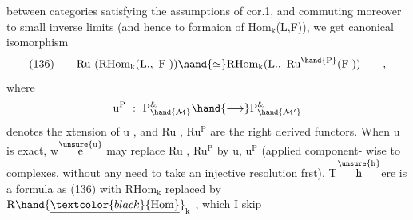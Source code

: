 between categories\deleted{,}  satisfying the assumptions of cor.1,  and 
commuting moreover to small inverse limits (and hence to formaion of
Hom$_{\mathrm{k}}$(L,F)),  we get  canonical isomorphism
\[ \text{(136)}\qquad \mathrm{Ru}\ (\mathrm{RHom}_{\mathrm{k}}(\mathrm{L}.,\ \mathrm{F}^{\cdot})) \hand{\simeq} \mathrm{RHom}_{\mathrm{k}}(\mathrm{L}.,\ \mathrm{Ru}^{\hand{\mathrm{P}}}(\mathrm{F}^{\cdot}))\qquad , \]
where
\[ \mathrm{u}^{\mathrm{P}}\ :\ \mathrm{P}^{\&}_{\hand{\mathcal{M}}} \hand{\longrightarrow} \mathrm{P}^{\&}_{\hand{\mathcal{M}'}} \]
denotes the xtension of u ,  and Ru , Ru$^{\mathrm{P}}$ are the right derived functors.
When u is exact,  w\(\overset{\unsure{\text{u}}}{\text{e}}\) may replace Ru , Ru$^{\mathrm{P}}$  by u, u$^{\mathrm{P}}$  (applied component-%
wise to complexes,  without any need to take an injective resolution
frst).  T\(\overset{\unsure{\text{h}}}{\text{h}}\)ere is a formula as (136)  with RHom$_{\mathrm{k}}$ replaced by $\mathrm{R}\hand{\underline{\textcolor{black}{\mathrm{Hom}}}}_{\mathrm{k}}$ ,
which I skip


